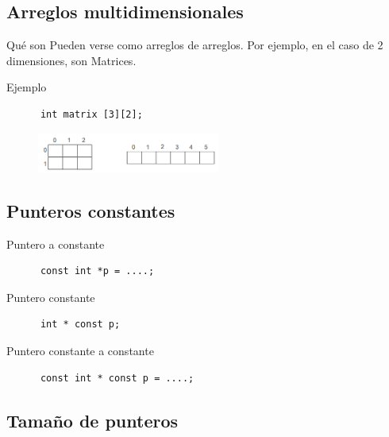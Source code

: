\documentclass[xcolor=table,spanish,9pt]{beamer}
\begin{document}
\subsection{Arreglos multidimensionales}

\begin{frame}[fragile]
  \begin{block}{Qué son}
    Pueden verse como arreglos de arreglos. Por ejemplo, en el caso de 2 dimensiones, son Matrices.
  \end{block}
  \begin{block}{Ejemplo}
    \begin{lstlisting}
      int matrix [3][2]; 
    \end{lstlisting}
    \begin{figure}
      \includegraphics[width=6cm,keepaspectratio=true,clip=true]
      {./figures/matrix.png}\\
    \end{figure}
  \end{block}
\end{frame}


\subsection{Punteros constantes}

\begin{frame}[fragile]
  \begin{block}{Puntero a constante}
    \begin{lstlisting}
      const int *p = ....;
    \end{lstlisting}
  \end{block}
  \begin{block}{Puntero constante}
    \begin{lstlisting}
      int * const p; 
    \end{lstlisting}
  \end{block}
  \begin{block}{Puntero constante a constante}
    \begin{lstlisting}
      const int * const p = ....; 
    \end{lstlisting}
  \end{block}
\end{frame}


\subsection{Tamaño de punteros}
\end{document}
